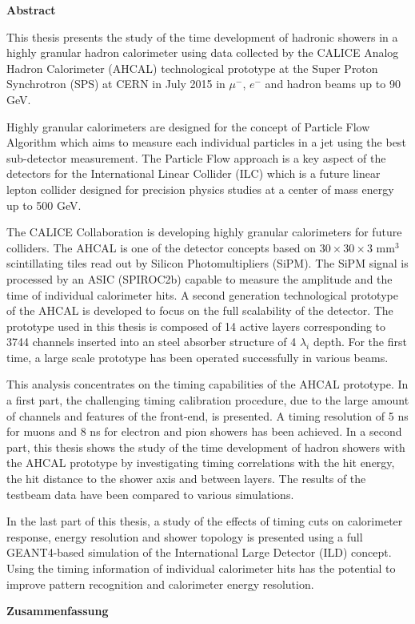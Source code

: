 \cleardoublepage
{}
{}

\thispagestyle{empty}
\begin{center}
{\bf Abstract}
\end{center}

This thesis presents the study of the time development of hadronic showers in a highly granular hadron calorimeter using data collected by the CALICE Analog Hadron Calorimeter (AHCAL) technological prototype at the Super Proton Synchrotron (SPS) at CERN in July 2015 in $\mu^-$, $e^-$ and hadron beams up to 90 GeV.

Highly granular calorimeters are designed for the concept of Particle Flow Algorithm which aims to measure each individual particles in a jet using the best sub-detector measurement. The Particle Flow approach is a key aspect of the detectors for the International Linear Collider (ILC) which is a future linear lepton collider designed for precision physics studies at a center of mass energy up to 500 GeV.

The CALICE Collaboration is developing highly granular calorimeters for future colliders. The AHCAL is one of the detector concepts based on $30\times30\times3$ mm$^3$ scintillating tiles read out by Silicon Photomultipliers (SiPM). The SiPM signal is processed by an ASIC (SPIROC2b) capable to measure the amplitude and the time of individual calorimeter hits. A second generation technological prototype of the AHCAL is developed to focus on the full scalability of the detector. The prototype used in this thesis is composed of 14 active layers corresponding to 3744 channels inserted into an steel absorber structure of 4 $\lambda_i$ depth. For the first time, a large scale prototype has been operated successfully in various beams.

This analysis concentrates on the timing capabilities of the AHCAL prototype. In a first part, the challenging timing calibration procedure, due to the large amount of channels and features of the front-end, is presented. A timing resolution of 5 ns for muons and 8 ns for electron and pion showers has been achieved. In a second part, this thesis shows the study of the time development of hadron showers with the AHCAL prototype by investigating timing correlations with the hit energy, the hit distance to the shower axis and between layers. The results of the testbeam data have been compared to various simulations.

In the last part of this thesis, a study of the effects of timing cuts on calorimeter response, energy resolution and shower topology is presented using a full GEANT4-based simulation of the International Large Detector (ILD) concept. Using the timing information of individual calorimeter hits has the potential to improve pattern recognition and calorimeter energy resolution.

\newpage
\thispagestyle{empty}
\begin{center}
{\bf Zusammenfassung}
\end{center}
\lipsum[23]
